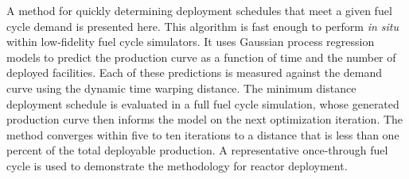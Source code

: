 A method for quickly determining deployment schedules that meet a given 
fuel cycle demand is presented here. This algorithm is fast enough to 
perform \emph{in situ} within low-fidelity fuel cycle simulators. It uses
Gaussian process regression models to predict the production curve as a 
function of time and the number of deployed facilities. Each of these
predictions is measured against the demand curve using the dynamic time
warping distance. The minimum distance deployment schedule is evaluated
in a full fuel cycle simulation, whose generated production curve 
then informs the model on the next optimization iteration. The method
converges within five to ten iterations to a distance that is less than one 
percent of the total deployable production. A representative once-through
fuel cycle is used to demonstrate the methodology for reactor deployment.
